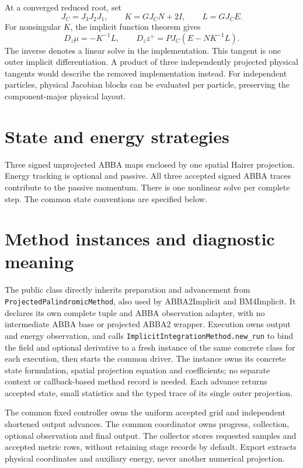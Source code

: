 \documentclass[11pt,a4paper]{article}
\begin{document}
At a converged reduced root, set
\[
J_C=J_3J_2J_1,\qquad K=GJ_CN+2I,\qquad L=GJ_CE.
\]
For nonsingular $K$, the implicit function theorem gives
\[
D_z\mu=-K^{-1}L,\qquad D_z z^+=P J_C(E-NK^{-1}L).
\]
The inverse denotes a linear solve in the implementation. This tangent is one
outer implicit differentiation. A product of three independently projected
physical tangents would describe the removed implementation instead.
For independent particles, physical Jacobian blocks can be evaluated per
particle, preserving the component-major physical layout.

\section{State and energy strategies}
Three signed unprojected ABBA maps enclosed by one spatial Hairer projection. Energy tracking is optional and passive.
All three accepted signed ABBA traces contribute to the passive momentum. There is one nonlinear solve per complete step.
The common state conventions are specified below.

\section{Method instances and diagnostic meaning}

The public class directly inherits preparation and advancement from
\texttt{ProjectedPalindromicMethod}, also used by ABBA2Implicit and BM4Implicit.
It declares its own complete tuple and ABBA observation adapter, with no
intermediate ABBA base or projected ABBA2 wrapper.
Execution owns output and energy observation,
and calls
\texttt{ImplicitIntegrationMethod.new\_run} to bind the field and optional
derivative to a fresh instance of the same
concrete class for each execution, then starts the common driver. The instance
owns its concrete state formulation, spatial projection equation and coefficients; no separate context
or callback-based method record is needed. Each advance returns accepted state,
small statistics and the typed trace of its single outer projection.

The common fixed controller owns the uniform accepted grid and independent
shortened output advances. The common coordinator owns progress, collection,
optional observation and final output. The collector stores requested samples
and accepted metric rows, without retaining stage records by default.
Export extracts physical coordinates and auxiliary energy, never another
numerical projection.
\end{document}
